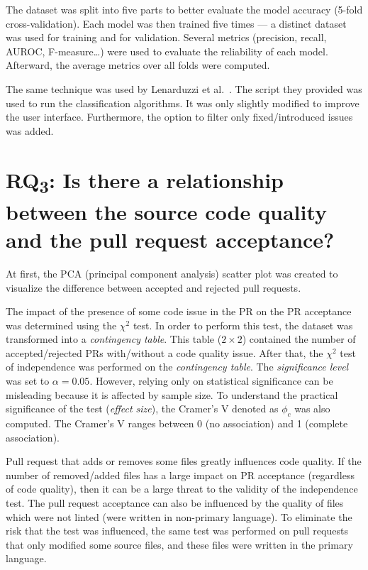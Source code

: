 \documentclass[digital,oneside,oldtable,nolof,nolot,nocover]{fithesis4}
\begin{document}
The dataset was split into five parts to better evaluate the model accuracy
(5-fold cross-validation).  Each model was then trained five times ---
a distinct dataset was used for training and for validation.  Several metrics
(precision, recall, AUROC, F-measure\dots{}) were used to evaluate the
reliability of each model. Afterward, the average metrics over all folds
were computed.

The same technique was used by Lenarduzzi et al.~\cite{quality}. The script
they provided was used to run the classification algorithms. It was only
slightly modified to improve the user interface. Furthermore, the option
to filter only fixed/introduced issues was added.
\section{RQ\textsubscript{3}: Is there a relationship between the source code quality and the pull request acceptance?}
\label{sec:orgc5f5ff6}
At first, the PCA (principal component analysis) scatter plot was created to
visualize the difference between accepted and rejected pull requests.

The impact of the presence of some code issue in the PR on the PR acceptance was
determined using the \(\chi^2\) test. In order to perform this test, the dataset
was transformed into a \emph{contingency table}.  This table (\(2 \times 2\)) contained
the number of accepted/rejected PRs with/without a code quality issue.
After that, the \(\chi^2\) test of independence was performed on the
\emph{contingency table}.  The \emph{significance level} was set to \(\alpha =
   0.05\). However, relying only on statistical significance can be misleading
because it is affected by sample size. To understand the practical
significance of the test (\emph{effect size}), the Cramer's V denoted as \(\phi_c\)
was also computed. The Cramer's V ranges between 0 (no
association) and 1 (complete association).

Pull request that adds or removes some files greatly influences
code quality. If the number of removed/added files has a large impact on PR
acceptance (regardless of code quality), then it can be a large threat to
the validity of the independence test.  The pull request acceptance can also be
influenced by the quality of files which were not linted (were written in
non-primary language).  To eliminate the risk that the test was influenced,
the same test was performed on pull requests that only modified some source
files, and these files were written in the primary language.
\end{document}
